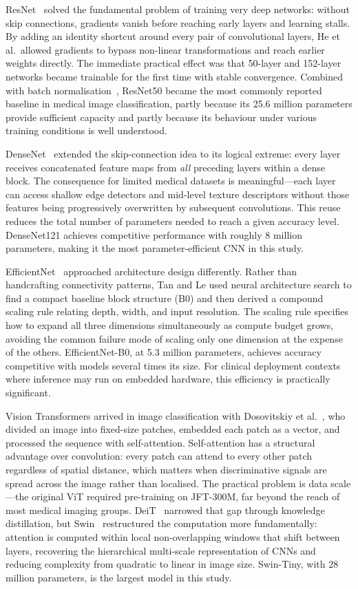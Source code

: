 \documentclass[11pt,a4paper]{report}
\begin{document}
ResNet~\cite{he2016deep} solved the fundamental problem of training very deep networks: without skip connections, gradients vanish before reaching early layers and learning stalls. By adding an identity shortcut around every pair of convolutional layers, He et al.\ allowed gradients to bypass non-linear transformations and reach earlier weights directly. The immediate practical effect was that 50-layer and 152-layer networks became trainable for the first time with stable convergence. Combined with batch normalisation~\cite{ioffe2015batch}, ResNet50 became the most commonly reported baseline in medical image classification, partly because its 25.6 million parameters provide sufficient capacity and partly because its behaviour under various training conditions is well understood.

DenseNet~\cite{huang2017densely} extended the skip-connection idea to its logical extreme: every layer receives concatenated feature maps from \textit{all} preceding layers within a dense block. The consequence for limited medical datasets is meaningful---each layer can access shallow edge detectors and mid-level texture descriptors without those features being progressively overwritten by subsequent convolutions. This reuse reduces the total number of parameters needed to reach a given accuracy level. DenseNet121 achieves competitive performance with roughly 8 million parameters, making it the most parameter-efficient CNN in this study.

EfficientNet~\cite{tan2019efficientnet} approached architecture design differently. Rather than handcrafting connectivity patterns, Tan and Le used neural architecture search to find a compact baseline block structure (B0) and then derived a compound scaling rule relating depth, width, and input resolution. The scaling rule specifies how to expand all three dimensions simultaneously as compute budget grows, avoiding the common failure mode of scaling only one dimension at the expense of the others. EfficientNet-B0, at 5.3 million parameters, achieves accuracy competitive with models several times its size. For clinical deployment contexts where inference may run on embedded hardware, this efficiency is practically significant.

Vision Transformers arrived in image classification with Dosovitskiy et al.~\cite{dosovitskiy2021image}, who divided an image into fixed-size patches, embedded each patch as a vector, and processed the sequence with self-attention. Self-attention has a structural advantage over convolution: every patch can attend to every other patch regardless of spatial distance, which matters when discriminative signals are spread across the image rather than localised. The practical problem is data scale---the original ViT required pre-training on JFT-300M, far beyond the reach of most medical imaging groups. DeiT~\cite{touvron2021deit} narrowed that gap through knowledge distillation, but Swin~\cite{liu2021swin} restructured the computation more fundamentally: attention is computed within local non-overlapping windows that shift between layers, recovering the hierarchical multi-scale representation of CNNs and reducing complexity from quadratic to linear in image size. Swin-Tiny, with 28 million parameters, is the largest model in this study.
\end{document}
